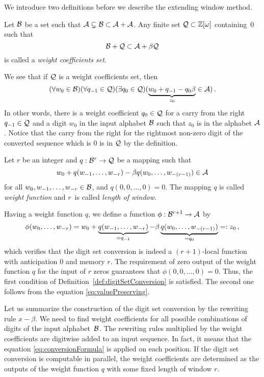    
    We introduce two definitions before we describe the extending window method.
    \begin{defn}
    \label{def:weightCoefficientsSet}
        Let $\mathcal{B}$ be a set such that $\mathcal{A} \subsetneq \mathcal{B} \subset \mathcal{A}+\mathcal{A}$. Any finite set $\mathcal{Q}\subset\mathbb{Z}[\omega]$ containing~0 such that 
        $$
            \mathcal{B} + \mathcal{Q} \subset \mathcal{A} + \beta \mathcal{Q}
        $$  
        is called a \emph{weight coefficients set}.
    \end{defn}
    We see that if $\mathcal{Q}$ is a weight coefficients set, then
        $$
        (\forall w_0 \in \mathcal{B})(\forall q_{-1}\in\mathcal{Q})(\exists q_0 \in \mathcal{Q} )(\underbrace{w_0 + q_{-1} - q_0 \beta}_{z_0} \in \mathcal{A} )\,.
        $$
    In other words, there is a weight coefficient $q_0 \in \mathcal{Q}$ for a carry from the right $q_{-1}\in \mathcal{Q}$ and a digit $w_0$ in the input alphabet $\mathcal{B}$ such that $z_0$ is in the alphabet $\mathcal{A}$.  Notice that  the  carry from the right for the rightmost non-zero digit of the converted sequence which is $0$ is in $\mathcal{Q}$ by the definition.
    \begin{defn}
    Let $r$ be an integer and $q:\mathcal{B}^{r} \rightarrow \mathcal{Q}$ be a mapping such that 
    $$
    w_0+ q(w_{-1}, \dots, w_{-r}) - \beta q(w_{0}, \dots, w_{-(r-1)}) \in \mathcal{A}
    $$
    for all $w_0,w_{-1}, \dots, w_{-r} \in \mathcal{B}$, and $q(0,0,\dots,0)=0$. The mapping $q$ is called \emph{weight function} and $r$~is called \emph{length of window}.    
    \end{defn}

 Having a weight function $q$, we define a function $\phi:\mathcal{B}^{r+1}\rightarrow \mathcal{A}$ by
    \begin{equation}
    \label{eq:localConversion}
        \phi(w_{0}, \dots, w_{-r})=w_0+ \underbrace{q(w_{-1}, \dots, w_{-r})}_{=q_{-1}} - \beta \underbrace{q(w_{0}, \dots, w_{-(r-1)})}_{=q_0}=:z_0\,,
    \end{equation} 
    which verifies that the digit set conversion is indeed a $(r+1)$-local function with anticipation $0$ and memory $r$. The requirement of zero output of the weight function $q$ for the input of $r$ zeros guarantees that $\phi(0,0,\dots,0)=0$. Thus, the first condition of Definition~\ref{def:digitSetConversion} is satisfied. The second one follows from the equation \eqref{eq:valuePreserving}. 
    
Let us summarize the construction of the digit set conversion by the rewriting rule \mbox{$x-\beta$}. We need to find weight coefficients for all possible combinations of digits of the input alphabet~$\mathcal{B}$. The rewriting rules multiplied by the weight coefficients are digitwise added to an input sequence. In fact, it means that the equation  \eqref{eq:conversionFormula} is applied on each position. If the digit set conversion is computable in parallel, the weight coefficients are determined as the outputs of the weight function $q$ with some fixed length of window $r$.  

